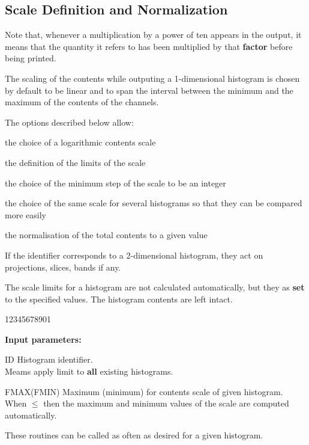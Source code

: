 \subsection{Scale Definition and Normalization}
\label{HSCALNOR}

Note that, whenever a multiplication by
a power of ten appears in the output, it means
that the quantity it refers to has been
multiplied by that {\bf factor} before being printed.
 
The scaling of the contents while
outputing a 1-dimensional histogram is chosen by
default to be linear and to span the interval between the minimum
and the maximum of the contents of the channels.
 
The options described below allow:
 
\begin{UL}
\item the choice of a logarithmic contents scale
\item the definition of the limits of the scale
\item the choice of the minimum step of the scale to be an integer
\item the choice of the same scale for
several histograms so that they can be compared more easily
\item the normalisation of the total contents to a given value
\end{UL}
 
If the identifier corresponds to a 2-dimensional histogram,
they act on projections, slices, bands if any.
 
 
\Action
The scale limits for a histogram are not calculated
automatically, but they as {\bf set} to the specified values.
The histogram contents are left intact.
 
\begin{DLttc}{12345678901}
\item[{\rm\bf Input parameters:}]
\item[ID] Histogram identifier.\\
 Meams apply limit to {\bf all} existing histograms.
\item[FMAX(FMIN)] Maximum (minimum)
for contents scale of given histogram.\\
When \(\leq\) then the maximum and minimum values of the
scale are computed automatically.
\end{DLttc}
 
These routines can be called as often as desired for a given histogram.
 
